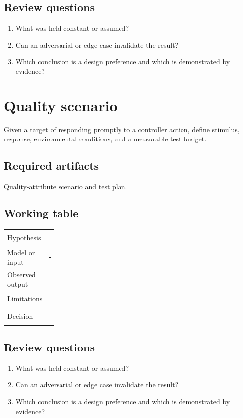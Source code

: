 \documentclass[11pt]{article}
\begin{document}
\subsection{Review questions}
\begin{enumerate}
\item What was held constant or assumed?
\item Can an adversarial or edge case invalidate the result?
\item Which conclusion is a design preference and which is demonstrated by evidence?
\end{enumerate}

\section{Quality scenario}
Given a target of responding promptly to a controller action, define stimulus, response, environmental conditions, and a measurable test budget.


\subsection{Required artifacts}
Quality-attribute scenario and test plan.


\subsection{Working table}
\begin{tabularx}{\linewidth}{@{}p{0.20\linewidth}X@{}}\toprule
Hypothesis & \rule{0.90\linewidth}{0.4pt}\\[0.35cm]
Model or input & \rule{0.90\linewidth}{0.4pt}\\[0.35cm]
Observed output & \rule{0.90\linewidth}{0.4pt}\\[0.35cm]
Limitations & \rule{0.90\linewidth}{0.4pt}\\[0.35cm]
Decision & \rule{0.90\linewidth}{0.4pt}\\\bottomrule\end{tabularx}

\subsection{Review questions}
\begin{enumerate}
\item What was held constant or assumed?
\item Can an adversarial or edge case invalidate the result?
\item Which conclusion is a design preference and which is demonstrated by evidence?
\end{enumerate}
\end{document}
